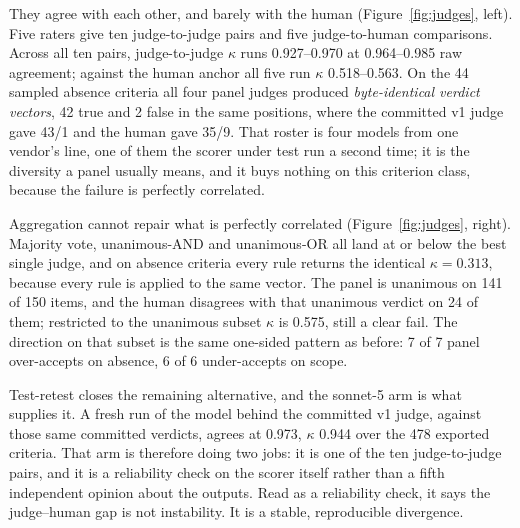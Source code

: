 \documentclass[11pt]{article}
\begin{document}
They agree with each other, and barely with the human
(Figure~\ref{fig:judges}, left). Five raters give ten judge-to-judge pairs and
five judge-to-human comparisons. Across all ten pairs, judge-to-judge $\kappa$
runs 0.927--0.970 at 0.964--0.985 raw agreement; against the human anchor all
five run $\kappa$ 0.518--0.563. On the 44 sampled absence criteria all four
panel judges produced \emph{byte-identical verdict vectors}, 42 true and 2
false in the same positions, where the committed v1 judge gave 43/1 and the
human gave 35/9. That roster is four models from one vendor's line, one of
them the scorer under test run a second time; it is the diversity a panel
usually means, and it buys nothing on this criterion class, because the
failure is perfectly correlated.

Aggregation cannot repair what is perfectly correlated
(Figure~\ref{fig:judges}, right). Majority vote, unanimous-AND and
unanimous-OR all land at or below the best single judge, and on absence
criteria every rule returns the identical $\kappa = 0.313$, because every rule
is applied to the same vector. The panel is unanimous on 141 of 150 items, and
the human disagrees with that unanimous verdict on 24 of them; restricted to
the unanimous subset $\kappa$ is 0.575, still a clear fail. The direction on
that subset is the same one-sided pattern as before: 7 of 7 panel over-accepts
on absence, 6 of 6 under-accepts on scope.

Test-retest closes the remaining alternative, and the sonnet-5 arm is what
supplies it. A fresh run of the model behind the committed v1 judge, against
those same committed verdicts, agrees at 0.973, $\kappa$ 0.944 over the 478
exported criteria. That arm is therefore doing two jobs: it is one of the ten
judge-to-judge pairs, and it is a reliability check on the scorer itself
rather than a fifth independent opinion about the outputs. Read as a
reliability check, it says the judge--human gap is not instability. It is a
stable, reproducible divergence.
\end{document}
